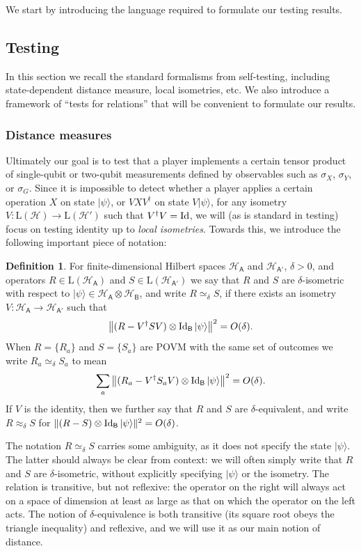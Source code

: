 \documentclass[11pt]{article}
\numberwithin{equation}{section}
\theoremstyle{definition}
\newtheorem{definition}[theorem]{Definition}
\theoremstyle{plain}
\newcommand{\ket}[1]{|#1\rangle}
\newcommand{\Id}{\ensuremath{\mathop{\rm Id}\nolimits}}
\newcommand{\setft}[1]{\mathrm{#1}}
\newcommand{\Lin}{\setft{L}}
\newcommand{\reg}[1]{{\textsf{#1}}}
\newcommand{\mH}{\mathcal{H}}
\begin{document}
We start by introducing the language required to formulate our testing results. 



\subsection{Testing}
\label{sec:general-rigidity}
In this section we recall the standard formalisms from self-testing, including state-dependent distance measure, local isometries, etc. We also introduce a framework of ``tests for relations'' that will be convenient to formulate our results. 


\subsubsection{Distance measures}

Ultimately our goal is to test that a player implements a certain tensor product of single-qubit or two-qubit measurements defined by observables such as $\sigma_X$, $\sigma_Y$, or $\sigma_G$. Since it is impossible to detect whether a player applies a certain operation $X$ on state $\ket{\psi}$, or $VXV^\dagger$ on state $V\ket{\psi}$, for any isometry $V:\Lin(\mH)\to\Lin(\mH')$ such that $V^\dagger V = \Id$, we will (as is standard in testing) focus on testing identity up to \emph{local isometries}. Towards this, we introduce the following important piece of notation: 

\begin{definition}
For finite-dimensional Hilbert spaces $\mH_{\reg{A}}$ and $\mH_{\reg{A}'}$, $\delta>0$, and operators $R \in\Lin(\mH_{\reg{A}})$ and $S\in\Lin(\mH_{\reg{A}'})$ we say that $R$ and $S$ are $\delta$-isometric with respect to $\ket{\psi} \in \mH_{\reg{A}} \otimes \mH_{\reg{B}}$, and write $R\simeq_\delta S$, if there exists an isometry $V:\mH_{\reg{A}}\to\mH_{\reg{A}'}$ such that 
$$\big\|( R-V^\dagger SV)\otimes \Id_{\reg{B}} \ket{\psi}\big\|^2=O(\delta).$$
When $R = \{R_a\}$ and $S=\{S_a\}$ are POVM with the same set of outcomes we write $R_a \simeq_\delta S_a$ to mean
$$\sum_a \big\|( R_a-V^\dagger S_a V)\otimes \Id_{\reg{B}} \ket{\psi}\big\|^2=O(\delta).$$
If $V$ is the identity, then we further say that $R$ and $S$ are $\delta$-equivalent, and write $R\approx_\delta S$ for $\| ( R- S) \otimes \Id_{\reg{B}} \ket{\psi}\|^2=O(\delta)$.
\end{definition}

The notation $R\simeq_\delta S$ carries some ambiguity, as it does not specify the state $\ket{\psi}$. The latter should always be clear from context: we will often simply write that $R$ and $S$ are $\delta$-isometric, without explicitly specifying $\ket{\psi}$ or the isometry. The relation is transitive, but not reflexive: the operator on the right will always act on a space of dimension at least as large as that on which the operator on the left acts. The notion of $\delta$-equivalence is both transitive (its square root obeys the triangle inequality) and reflexive, and we will use it as our main notion of distance. 
\end{document}
